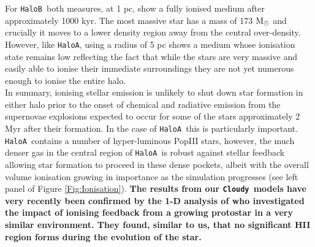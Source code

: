 \documentclass[twocolumn,iop,revtex4]{openjournal}
\newcommand{\cloudy}{\texttt{Cloudy~}}
\newcommand{\msolar} {$\rm{M_{\odot}}~$}
\newcommand{\ha} {\texttt{HaloA~}}
\newcommand{\hb} {\texttt{HaloB~}}
\newcommand{\hac} {\texttt{HaloA}}
\begin{document}
\indent For \hb both measures, at 1 pc,  show a fully ionised medium
after approximately 1000 kyr. The most massive star has a mass of 173 \msolar and crucially
it moves to a lower
density region away from the central over-density. However, like \hac, using a radius of 5 pc shows
a medium whose ionisation state remains low reflecting the fact that while the stars are very
massive and easily able to ionise their immediate surroundings they are not yet numerous enough
to ionise the entire halo. \\
\indent In summary, ionising stellar emission is unlikely to shut down star formation in
either halo prior to the onset of chemical and radiative emission from the supernovae
explosions expected to occur for some of the stars \citep[e.g. see][]{Heger_2003}
approximately 2 Myr  after their formation. In
the case of \ha this is particularly important. \ha contains a number of hyper-luminous PopIII stars,
however, the much denser gas in the central region of \ha is robust against stellar feedback
allowing star formation to proceed in these dense pockets, 
albeit with the overall volume ionisation growing in importance as the simulation progresses
(see left panel of Figure \ref{Fig:Ionisation}). \textbf{The results from our \cloudy models have
  very recently been confirmed by the 1-D analysis of \cite{Sakurai_2020} who investigated the
impact of ionising feedback from a growing protostar in a very similar environment. They found,
similar to us, that no significant HII region forms during the evolution of the star. }
\end{document}
